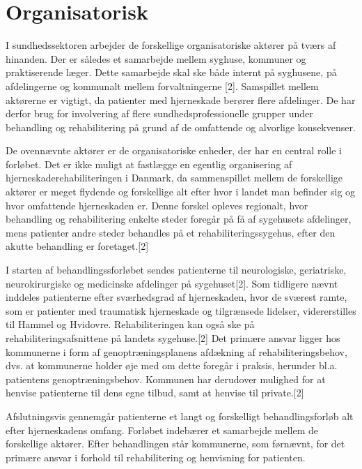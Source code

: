 \section{Organisatorisk}
I sundhedssektoren arbejder de forskellige organisatoriske aktører på tværs af hinanden. Der er således et samarbejde mellem syghuse, kommuner og praktiserende læger. Dette samarbejde skal ske både internt på syghusene, på afdelingerne og kommunalt mellem forvaltningerne [2]. Samspillet mellem aktørerne er vigtigt, da patienter med hjerneskade berører flere afdelinger. De har derfor brug for involvering af flere sundhedsprofessionelle grupper under behandling og rehabilitering på grund af de omfattende og alvorlige konsekvenser.

De ovennævnte aktører er de organisatoriske enheder, der har en central rolle i forløbet. Det er ikke muligt at fastlægge en egentlig organisering af hjerneskaderehabiliteringen i Danmark, da sammenspillet mellem de forskellige aktører er meget flydende og forskellige alt efter hvor i landet man befinder sig og hvor omfattende hjerneskaden er. Denne forskel opleves regionalt, hvor behandling og rehabilitering enkelte steder foregår på få af sygehusets afdelinger, mens patienter andre steder behandles på et rehabiliteringssygehus, efter den akutte behandling er foretaget.[2] 

I starten af behandlingssforløbet sendes patienterne til neurologiske, geriatriske, neurokirurgiske og medicinske afdelinger på sygehuset[2]. Som tidligere nævnt inddeles patienterne efter sværhedsgrad af hjerneskaden, hvor de sværest ramte, som er patienter med traumatisk hjerneskade og tilgrænsede lidelser, vidererstilles til Hammel og Hvidovre. Rehabiliteringen kan også ske på rehabiliteringsafsnittene på landets sygehuse.[2]
Det primære ansvar ligger hos kommunerne i form af genoptræningsplanens afdækning af rehabiliteringsbehov, dvs. at kommunerne holder øje med om dette foregår i praksis, herunder bl.a. patientens genoptræningsbehov. Kommunen har derudover mulighed for at henvise patienterne til dens egne tilbud, samt at henvise til private.[2] 

Afslutningsvis gennemgår patienterne et langt og forskelligt behandlingsforløb alt efter hjerneskadens omfang. Forløbet indebærer et samarbejde mellem de forskellige aktører. Efter behandlingen står kommunerne, som førnævnt, for det primære ansvar i forhold til rehabilitering og henvisning for patienten.
  




